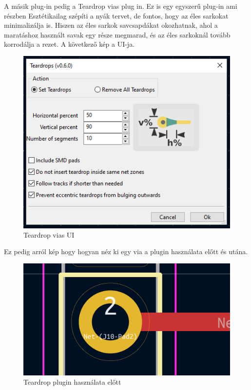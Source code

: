 \documentclass[a4paper,12pt,oneside]{book}
\begin{document}
A másik plug-in pedig a Teardrop vias plug in. Ez is egy egyszerű plug-in ami részben Esztétikailag szépíti a nyák tervet, de fontos, hogy az éles sarkokat minimalizálja is. Hiszen az éles sarkok savcsapdákat okozhatnak, ahol a maratáshoz használt savak egy része megmarad, és az éles sarkoknál tovább korrodálja a rezet. A következő kép a UI-ja.
\begin{figure}[H]
	\centering
	\includegraphics[trim=1mm 1mm 1mm 1mm,scale=0.75]{rounded vias ui.PNG}
	\caption{Teardrop vias UI} 
	\label{Teardrop vias UI}
\end{figure}
Ez pedig arról kép hogy hogyan néz ki egy via a plugin használata előtt és utána.
\begin{figure}[H]
	\centering
	\includegraphics[trim=1mm 1mm 1mm 1mm,scale=0.4]{viabefore.PNG}
	\caption{Teardrop plugin használata előtt}
	\label{Teardrop plugin használata előtt} 
\end{figure}
\end{document}
